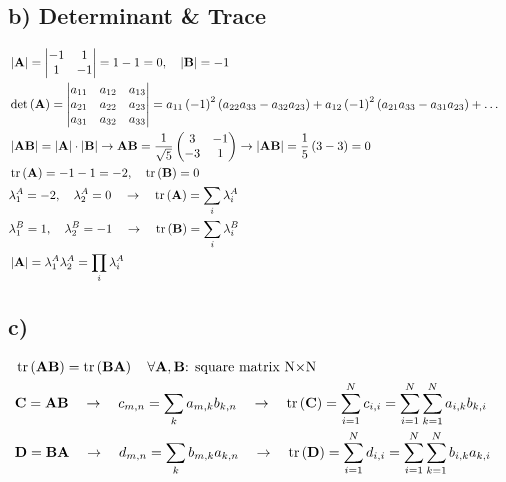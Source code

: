 \subsection*{b) Determinant \& Trace}
\begin{align*}
	&\left|\mathbf{A}\right| =
	\begin{vmatrix}
	-1 & 1 \\
	1 & -1
	\end{vmatrix} = 1-1 = 0,\quad
	\left|\mathbf{B}\right| = -1& \\
	&\det\left(\mathbf{A}\right)=
	\begin{vmatrix}
	a_{11} & a_{12} & a_{13} \\
	a_{21} & a_{22} & a_{23} \\
	a_{31} & a_{32} & a_{33}
	\end{vmatrix}= a_{11}\left(-1\right)^{2}\left(a_{22}a_{33}-a_{32}a_{23}\right)+a_{12}\left(-1\right)^{2}\left(a_{21}a_{33}-a_{31}a_{23}\right)+\ldots& \\
	&\left|\mathbf{AB}\right|=\left|\mathbf{A}\right|\cdot\left|\mathbf{B}\right|\rightarrow\mathbf{AB}=\frac{1}{\sqrt{5}}
	\begin{pmatrix}
	3 & -1 \\
	-3 & 1
	\end{pmatrix}
	\rightarrow\left|\mathbf{AB}\right|=\frac{1}{5}\left(3-3\right)=0& \\
	&\operatorname{tr}\left(\mathbf{A}\right)=-1-1=-2,\quad\operatorname{tr}\left(\mathbf{B}\right)=0& \\
	&\lambda_{1}^{A}=-2,\quad\lambda_{2}^{A}=0\quad\rightarrow\quad\operatorname{tr}\left(\mathbf{A}\right)=\sum_{i}\lambda_{i}^{A}& \\
	&\lambda_{1}^{B}=1,\quad\lambda_{2}^{B}=-1\quad\rightarrow\quad\operatorname{tr}\left(\mathbf{B}\right)=\sum_{i}\lambda_{i}^{B}& \\
	&\left|\mathbf{A}\right|=\lambda_{1}^{A}\lambda_{2}^{A}=\prod_{i}\lambda_{i}^{A}&
\end{align*}

\subsection*{c)}
\begin{align*}
	&\operatorname{tr}\left(\mathbf{AB}\right)=\operatorname{tr}\left(\mathbf{BA}\right)\quad\forall\mathbf{A, B} \text{: square matrix N$\times$N}& \\
	&\mathbf{C=AB}\quad\rightarrow\quad c_{m,n}=\sum_{k}a_{m,k}b_{k,n}\quad\rightarrow\quad\operatorname{tr}\left(\mathbf{C}\right)=\sum_{i=1}^{N}c_{i,i}=\sum_{i=1}^{N}\sum_{k=1}^{N}a_{i,k}b_{k,i}& \\
	&\mathbf{D=BA}\quad\rightarrow\quad d_{m,n}=\sum_{k}b_{m,k}a_{k,n}\quad\rightarrow\quad\operatorname{tr}\left(\mathbf{D}\right)=\sum_{i=1}^{N}d_{i,i}=\sum_{i=1}^{N}\sum_{k=1}^{N}b_{i,k}a_{k,i}&
\end{align*}

